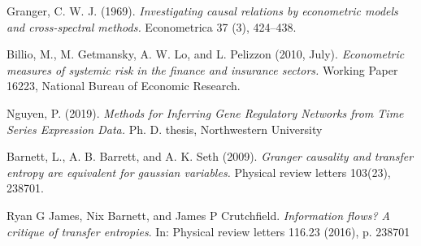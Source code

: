 \documentclass[12pt]{article}
\begin{document}
\begin{thebibliography}{00}
\setlength{\itemsep}{-1mm}
\small
{} Granger,
  C. W. J. (1969). \textit{Investigating causal relations by
    econometric models and cross-spectral methods.} Econometrica 37
  (3), 424–438.

 Billio, M., M. Getmansky, A. W. Lo, and
  L. Pelizzon (2010, July). \textit{Econometric measures of systemic
    risk in the finance and insurance sectors.}  Working Paper 16223,
  National Bureau of Economic Research.

  Nguyen, P. (2019). \textit{Methods for Inferring Gene Regulatory
    Networks from Time Series Expression Data.}
  Ph. D. thesis, Northwestern University

 Barnett, L., A. B. Barrett, and
  A. K. Seth (2009). \textit{Granger causality and transfer entropy
    are equivalent for gaussian variables.} Physical review letters
  103(23), 238701.
  
 Ryan G James, Nix Barnett, and
  James P Crutchfield. \textit{Information flows? A critique of
    transfer entropies}. In: Physical review letters 116.23 (2016),
  p. 238701
\end{thebibliography}
\normalsize
\end{document}
